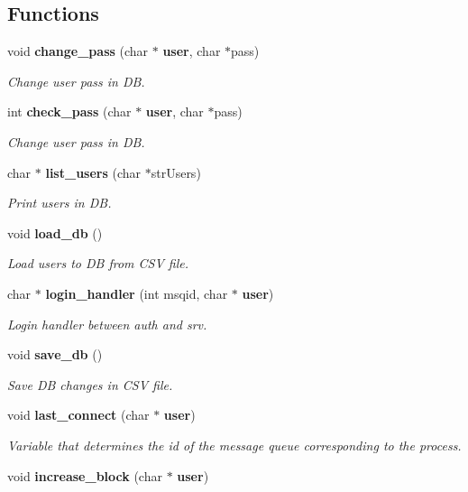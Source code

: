 \subsection*{Functions}
\begin{DoxyCompactItemize}
\item 
void \textbf{ change\+\_\+pass} (char $\ast$\textbf{ user}, char $\ast$pass)
\begin{DoxyCompactList}\small\item\em Change user pass in DB. \end{DoxyCompactList}\item 
int \textbf{ check\+\_\+pass} (char $\ast$\textbf{ user}, char $\ast$pass)
\begin{DoxyCompactList}\small\item\em Change user pass in DB. \end{DoxyCompactList}\item 
char $\ast$ \textbf{ list\+\_\+users} (char $\ast$str\+Users)
\begin{DoxyCompactList}\small\item\em Print users in DB. \end{DoxyCompactList}\item 
void \textbf{ load\+\_\+db} ()
\begin{DoxyCompactList}\small\item\em Load users to DB from C\+SV file. \end{DoxyCompactList}\item 
char $\ast$ \textbf{ login\+\_\+handler} (int msqid, char $\ast$\textbf{ user})
\begin{DoxyCompactList}\small\item\em Login handler between auth and srv. \end{DoxyCompactList}\item 
void \textbf{ save\+\_\+db} ()
\begin{DoxyCompactList}\small\item\em Save DB changes in C\+SV file. \end{DoxyCompactList}\item 
void \textbf{ last\+\_\+connect} (char $\ast$\textbf{ user})
\begin{DoxyCompactList}\small\item\em Variable that determines the id of the message queue corresponding to the process. \end{DoxyCompactList}\item 
void \textbf{ increase\+\_\+block} (char $\ast$\textbf{ user})

\end{DoxyCompactItemize}
